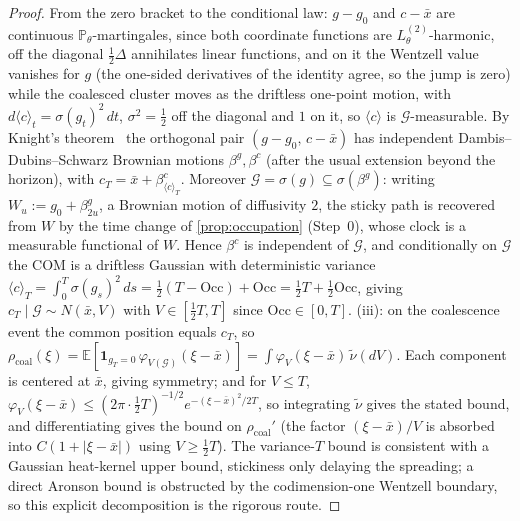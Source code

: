 \documentclass[reqno,final,11pt]{amsart}
\theoremstyle{plain}
\theoremstyle{definition}
\theoremstyle{remark}
\newcommand{\Prob}{\mathbb P}
\newcommand{\Lth}[1]{L^{(#1)}_{\theta}}
\newcommand{\Pth}{\Prob_{\theta}}
\begin{document}
\begin{proof}
From the zero bracket to the conditional law: $g-g_0$ and $c-\bar x$ are
continuous $\Pth$-martingales, since both coordinate functions are
$\Lth2$-harmonic, off the diagonal $\tfrac12\Delta$ annihilates linear
functions, and on it the Wentzell value vanishes for $g$ (the one-sided
derivatives of the identity agree, so the jump is zero) while the coalesced
cluster moves as the driftless one-point motion, with
$d\langle c\rangle_t=\sigma(g_t)^2\,dt$, $\sigma^2=\tfrac12$ off the diagonal
and $1$ on it, so $\langle c\rangle$ is $\mathcal G$-measurable. By Knight's
theorem~\citep[Ch.~V]{RevuzYor} the orthogonal pair $(g-g_0,\,c-\bar x)$ has
independent Dambis--Dubins--Schwarz Brownian motions
$\beta^{g},\beta^{c}$ (after the usual extension beyond the horizon), with
$c_T=\bar x+\beta^{c}_{\langle c\rangle_T}$. Moreover
$\mathcal G=\sigma(g)\subseteq\sigma(\beta^{g})$: writing
$W_u:=g_0+\beta^{g}_{2u}$, a Brownian motion of diffusivity $2$, the sticky
path is recovered from $W$ by the time change of \cref{prop:occupation}
(Step~0), whose clock is a measurable functional of $W$. Hence $\beta^{c}$ is
independent of $\mathcal G$, and conditionally on $\mathcal G$ the COM is a
driftless Gaussian with deterministic variance
$\langle c\rangle_T=\int_0^T \sigma(g_s)^2\,ds=\tfrac12(T-\mathrm{Occ})+\mathrm{Occ}
=\tfrac12 T+\tfrac12\mathrm{Occ}$, giving $c_T\mid\mathcal G\sim N(\bar x,V)$ with
$V\in[\tfrac12T,T]$ since $\mathrm{Occ}\in[0,T]$.
(iii): on the coalescence event the common position equals $c_T$, so
$\rho_{\mathrm{coal}}(\xi)=\mathbb E[\mathbf 1_{g_T=0}\,\varphi_{V(\mathcal G)}(\xi-\bar x)]
=\int\varphi_V(\xi-\bar x)\,\tilde\nu(dV)$. Each component is centered at $\bar x$, giving
symmetry; and for $V\le T$, $\varphi_V(\xi-\bar x)\le(2\pi\cdot\tfrac12 T)^{-1/2}
e^{-(\xi-\bar x)^2/2T}$, so integrating $\tilde\nu$ gives the stated bound, and
differentiating gives the bound on $\rho_{\mathrm{coal}}'$ (the factor $(\xi-\bar x)/V$
is absorbed into $C(1+|\xi-\bar x|)$ using $V\ge\tfrac12 T$). The variance-$T$
bound is consistent with a Gaussian heat-kernel upper bound, stickiness only
delaying the spreading; a direct Aronson bound is obstructed by the
codimension-one Wentzell boundary, so this explicit decomposition is the rigorous
route.
\end{proof}
\end{document}

